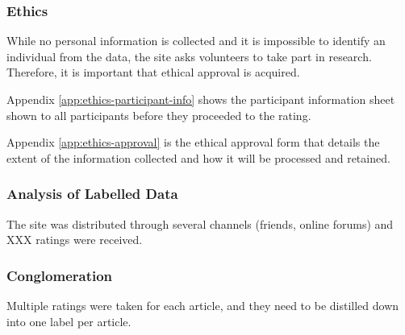 \subsubsection{Ethics}
 While no personal information is collected and it is impossible to identify an individual from the data, the site asks volunteers to take part in research. Therefore, it is important that ethical approval is acquired.

Appendix \ref{app:ethics-participant-info} shows the participant information sheet shown to all participants before they proceeded to the rating. 

Appendix \ref{app:ethics-approval} is the ethical approval form that details the extent of the information collected and how it will be processed and retained.

\subsubsection{Analysis of Labelled Data}
The site was distributed through several channels (friends, online forums) and XXX ratings were received.


\subsubsection{Conglomeration}
Multiple ratings were taken for each article, and they need to be distilled down into one label per article.